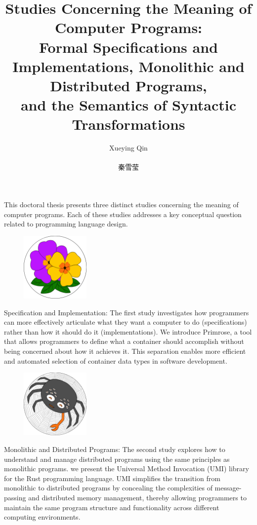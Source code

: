 \documentclass[phd,icsa,twoside,logo]{infthesis}
\title{Studies Concerning the Meaning of Computer Programs:\\\smaller Formal Specifications and Implementations, Monolithic and Distributed Programs,\\and the Semantics of Syntactic Transformations}
\author{Xueying Qin \\ \begin{CJK*}{UTF8}{gbsn}秦雪莹\end{CJK*}}
\newcommand{\Primrose}{\textsf{Primrose}\xspace}
\begin{document}
\begin{preliminary}

\maketitle
\begin{laysummary}
This doctoral thesis presents three distinct studies concerning the meaning of computer programs. Each of these studies addresses a key conceptual question related to programming language design.

\begin{figure}
  \vspace{-30pt}
  \begin{center}
    \includegraphics[width=0.3\textwidth]{Primrose.png}
  \end{center}
\end{figure}
Specification and Implementation: The first study investigates how programmers can more effectively articulate what they want a computer to do (specifications) rather than how it should do it (implementations). We introduce \Primrose{}, a tool that allows programmers to define what a container should accomplish without being concerned about how it achieves it. This separation enables more efficient and automated selection of container data types in software development.

\begin{figure}
  \vspace{-15pt}
  \begin{center}
    \includegraphics[width=0.3\textwidth]{SpiderCrab.png}
  \end{center}
\end{figure}
Monolithic and Distributed Programs: The second study explores how to understand and manage distributed programs using the same principles as monolithic programs. we present the Universal Method Invocation (UMI) library for the Rust programming language. UMI simplifies the transition from monolithic to distributed programs by concealing the complexities of message-passing and distributed memory management, thereby allowing programmers to maintain the same program structure and functionality across different computing environments.


\end{laysummary}
\end{preliminary}
\end{document}
